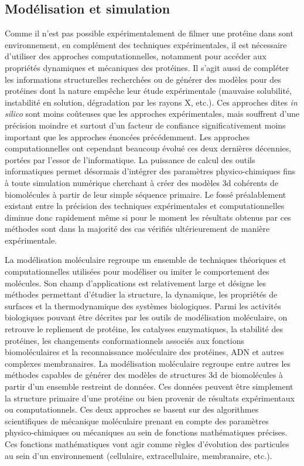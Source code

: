 \subsection{Modélisation et simulation}

Comme il n'est pas possible expérimentalement de filmer une protéine dans sont environnement, en complément des techniques expérimentales, il est nécessaire d'utiliser des approches computationnelles, notamment pour accéder aux propriétés dynamiques et mécaniques des protéines. Il s'agit aussi de compléter les informations structurelles recherchées ou de générer des modèles pour des protéines dont la nature empêche leur étude expérimentale (mauvaise solubilité, instabilité en solution, dégradation par les rayons X, etc.). Ces approches dites \textit{in silico} sont moins coûteuses que les approches expérimentales, mais souffrent d'une précision moindre et surtout d'un facteur de confiance significativement moins important que les approches énoncées précédemment. Les approches computationnelles ont cependant beaucoup évolué ces deux dernières décennies, portées par l'essor de l'informatique. La puissance de calcul des outils informatiques permet désormais d'intégrer des paramètres physico-chimiques fins à toute simulation numérique cherchant à créer des modèles 3d cohérents de biomolécules à partir de leur simple séquence primaire. Le fossé préalablement existant entre la précision des techniques expérimentales et computationnelles diminue donc rapidement même si pour le moment les résultats obtenus par ces méthodes sont dans la majorité des cas vérifiés ultérieurement de manière expérimentale.

La modélisation moléculaire regroupe un ensemble de techniques théoriques et computationnelles utilisées pour modéliser ou imiter le comportement des molécules.
Son champ d'applications est relativement large et désigne les méthodes permettant d'étudier la structure, la dynamique, les propriétés de surfaces et la thermodynamique des systèmes biologiques. Parmi les activités biologiques pouvant être décrites par les outils de modélisation moléculaire, on retrouve le repliement de protéine, les catalyses enzymatiques, la stabilité des protéines, les changements conformationnels associés aux fonctions biomoléculaires et la reconnaissance moléculaire des protéines, ADN et autres complexes membranaires.
La modélisation moléculaire regroupe entre autres les méthodes capables de générer des modèles de structures 3d de biomolécules à partir d'un ensemble restreint de données. Ces données peuvent être simplement la structure primaire d'une protéine ou bien provenir de résultats expérimentaux ou computationnels. Ces deux approches se basent sur des algorithmes scientifiques de mécanique moléculaire prenant en compte des paramètres physico-chimiques ou mécaniques au sein de fonctions mathématiques précises. Ces fonctions mathématiques vont agir comme règles d'évolution des particules au sein d'un environnement (cellulaire, extracellulaire, membranaire, etc.). 

